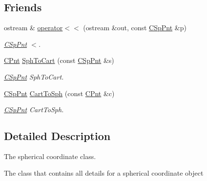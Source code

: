 \subsection*{Friends}
\begin{DoxyCompactItemize}
\item 
ostream \& \hyperlink{classCSpPnt_a53a39a67bc3f52a606be1d4e71085b3f}{operator$<$$<$} (ostream \&out, const \hyperlink{classCSpPnt}{C\-Sp\-Pnt} \&p)
\begin{DoxyCompactList}\small\item\em \hyperlink{classCSpPnt}{C\-Sp\-Pnt} $<$. \end{DoxyCompactList}\item 
\hyperlink{classCPnt}{C\-Pnt} \hyperlink{classCSpPnt_af8b263bb80bb3a76271a7f57d5057df3}{Sph\-To\-Cart} (const \hyperlink{classCSpPnt}{C\-Sp\-Pnt} \&s)
\begin{DoxyCompactList}\small\item\em \hyperlink{classCSpPnt}{C\-Sp\-Pnt} Sph\-To\-Cart. \end{DoxyCompactList}\item 
\hyperlink{classCSpPnt}{C\-Sp\-Pnt} \hyperlink{classCSpPnt_ad05fbf75e7550a927bc817f97115f2fc}{Cart\-To\-Sph} (const \hyperlink{classCPnt}{C\-Pnt} \&c)
\begin{DoxyCompactList}\small\item\em \hyperlink{classCSpPnt}{C\-Sp\-Pnt} Cart\-To\-Sph. \end{DoxyCompactList}\end{DoxyCompactItemize}


\subsection{Detailed Description}
The spherical coordinate class. 

The class that contains all details for a spherical coordinate object 

